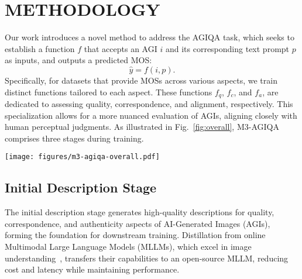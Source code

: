 
\section{METHODOLOGY} \label{sec:method}
Our work introduces a novel method to address the AGIQA task, which seeks to establish a function $f$ that accepts an AGI $i$ and its corresponding text prompt $p$ as inputs, and outputs a predicted MOS:
%
\begin{equation}
\hat{y} = f\left(i, p\right).
\end{equation}
%
Specifically, for datasets that provide MOSs across various aspects, we train distinct functions tailored to each aspect. 
These functions $f_q$, $f_c$, and $f_a$, are dedicated to assessing quality, correspondence, and alignment, respectively. 
This specialization allows for a more nuanced evaluation of AGIs, aligning closely with human perceptual judgments.
As illustrated in Fig.~\ref{fig:overall}, M3-AGIQA comprises three stages during training. 

\begin{figure*}
    \centering
    \texttt{[image: figures/m3-agiqa-overall.pdf]}
    \caption{Overview of the M3-AGIQA Framework. This diagram illustrates the three-stage process using the quality aspect of AGIs as an example. \textbf{(a) Initial Description Stage:} By using an online MLLM service via API, we obtain descriptions related to quality, correspondence, and authenticity for each image. 
    These descriptions are then used to fine-tune an open-source MLLM, enhancing its understanding of these aspects.
    \textbf{(b) Inference Stage:} Distilled captioning capabilities of the fine-tuned MLLM was leveraged coupled with the textual prompt to generate the required response. This step utilizes the refined ability of the MLLM to interpret and articulate the nuances of the input prompt and image.
    \textbf{(c) Training Stage:} We freeze all the parameters within the fine-tuned MLLM to ensure stability and reproducibility. A xLSTM feature extractor along with a regression head is then trained to predict the MOS, effectively translating enhanced perceptual and textual understanding of the MLLM into quantifiable assessments.}
    \label{fig:overall}
\end{figure*}

\subsection{Initial Description Stage} \label{subsec:distil}
The initial description stage generates high-quality descriptions for quality, correspondence, and authenticity aspects of AI-Generated Images (AGIs), forming the foundation for downstream training.
Distillation from online Multimodal Large Language Models (MLLMs), which excel in image understanding~\cite{jin2024efficient}, transfers their capabilities to an open-source MLLM, reducing cost and latency while maintaining performance.

